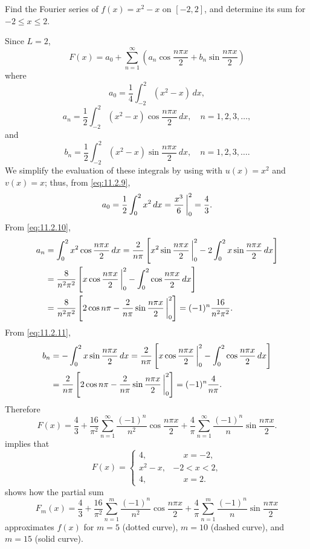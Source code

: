 \begin{example}\label{example:11.2.3}
Find the Fourier series of $f(x)=x^2-x$ on $[-2,2]$, and determine
its sum for $-2\le x\le 2$.
\end{example}

\begin{solution}
Since $L=2$,
\[
F(x)=a_0+\sum_{n=1}^\infty\left(a_n\cos\frac{n\pi
x}{2}+b_n\sin\frac{n\pi x}{2}\right)
\]
where
\begin{equation} \label{eq:11.2.9}
a_0=\frac{1}{4}\int_{-2}^2(x^2-x)\,dx,
\end{equation}
\begin{equation} \label{eq:11.2.10}
a_n=\frac{1}{2}\int_{-2}^2(x^2-x)\cos\frac{n\pi x}{2}\,dx,\quad
n=1,2,3,\dots,
\end{equation}
and
\begin{equation} \label{eq:11.2.11}
b_n=\frac{1}{2}\int_{-2}^2(x^2-x)\sin\frac{n\pi x}{2}\,dx,\quad
n=1,2,3,\dots.
\end{equation}
We simplify the evaluation of these integrals by using
   with $u(x)=x^2$ and $v(x)=x$;
thus, from \eqref{eq:11.2.9},
\[
a_0=\frac{1}{2}\int_0^2x^2\,dx=\frac{x^3}{6}\,\bigg|_{0}^{2}=\frac{4}{3}.
\]
From \eqref{eq:11.2.10},
\begin{align*}
a_n&=\int_0^2x^2\cos\frac{n\pi x}{2}\,dx=
\frac{2}{n\pi}\left[x^2\sin\frac{n\pi x}{2}\,\bigg|_{0}^{2}-
2\int_0^2x\sin\frac{n\pi x}{2}\,dx\right]\\
&=\frac{8}{n^2\pi^2}\left[x\cos\frac{n\pi x}{2}\,\bigg|_{0}^{2}-
\int_0^2\cos\frac{n\pi x}{2}\,dx\right]\\
&=\frac{8}{n^2\pi^2}\left[2\cos n\pi-\frac{2}{n\pi}\sin\frac{n\pi x}{2}\,\bigg|_{0}^{2}\right]
=(-1)^n\frac{16}{n^2\pi^2}.
\end{align*}
From \eqref{eq:11.2.11},
\begin{align*}
b_n&=-\int_0^2x\sin\frac{n\pi x}{2}\,dx
=\frac{2}{n\pi}\left[x\cos\frac{n\pi x}{2}\,\bigg|_{0}^{2}-
\int_0^2\cos\frac{n\pi x}{2}\,dx\right]\\
&=\frac{2}{n\pi}\left[2\cos n\pi-\frac{2}{n\pi}\sin\frac{n\pi x}{2}\,\bigg|_{0}^{2}\right]=(-1)^n\frac{4}{n\pi}.
\end{align*}
Therefore
\[
F(x)=\frac{4}{3}+\frac{16}{\pi^2}\sum_{n=1}^\infty\frac{(-1)^n}{n^2}
\cos\frac{n\pi x}{2}+\frac{4}{\pi}\sum_{n=1}^\infty
\frac{(-1)^n}{n}\sin\frac{n\pi x}{2}.
\]
 implies that
\[
F(x)=
\begin{cases}
4,&\phantom{-}x=-2,\\
x^2-x,&-2<x<2,\\
4,&\phantom{-}x=2.
\end{cases}
\]
 shows how the partial sum
\[
F_m(x)=\frac{4}{3}+\frac{16}{\pi^2}\sum_{n=1}^m\frac{(-1)^n}{n^2}
\cos\frac{n\pi x}{2}+\frac{4}{\pi}\sum_{n=1}^m
\frac{(-1)^n}{n}\sin\frac{n\pi x}{2}
\]
approximates $f(x)$ for $m=5$ (dotted curve), $m=10$  (dashed curve),
and $m=15$ (solid curve).
\end{solution}

